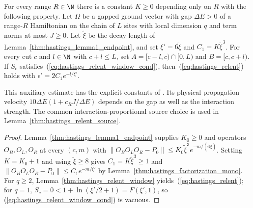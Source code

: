 \begin{lemma}
    \label{thm:hastings_relent}
    \leanok
    For every range $R\in\N$ there is a constant $K\ge0$ depending only on $R$
    with the following property. Let $\Omega$ be a gapped ground vector with
    gap $\Delta E>0$ of a range-$R$ Hamiltonian on the chain of $L$ sites with
    local dimension $q$ and term norms at most $J\ge0$. Let $\tilde\xi$ be the
    decay length of Lemma~\ref{thm:hastings_lemma1_endpoint}, and set
    $\xi'=6\tilde\xi$ and $C_1=K\tilde\xi^3$. For every cut $c$ and $l\in\N$
    with $c+l\le L$, set $A=\lbrack c-l,c)\cap\lbrack0,L)$ and $B=\lbrack c,c+l)$. If $S_c$
    satisfies~(\ref{eq:hastings_relent_window_cond}), then~(\ref{eq:hastings_relent})
    holds with $\epsilon'=2C_1e^{-l/\xi'}$.

    This auxiliary estimate has the explicit constants of
    \cite{gap:hastings07_relent_constants}. Its physical propagation
    velocity $10\Delta E(1+c_RJ/\Delta E)$ depends on the gap as well as
    the interaction strength. The common interaction-proportional source
    choice is used in Lemma~\ref{thm:hastings_relent_source}.
\end{lemma}
\begin{proof}\leanok
    Lemma~\ref{thm:hastings_lemma1_endpoint} supplies $K_0\ge0$ and operators
    $O_B,O_L,O_R$ at every $(c,m)$ with
    $\|O_BO_LO_R-P_0\|\le K_0\tilde\xi^3e^{-m/(6\tilde\xi)}$. Setting
    $K=K_0+1$ and using $\tilde\xi\ge8$ gives $C_1=K\tilde\xi^3\ge1$ and
    $\|O_BO_LO_R-P_0\|\le C_1e^{-m/\xi'}$ by
    Lemma~\ref{thm:hastings_factorization_mono}. For $q\ge2$,
    Lemma~\ref{thm:hastings_relent_window} yields~(\ref{eq:hastings_relent});
    for $q=1$, $S_c=0<1+\ln(\xi'/2+1)=F(\xi',1)$, so
    (\ref{eq:hastings_relent_window_cond}) is vacuous.
\end{proof}


